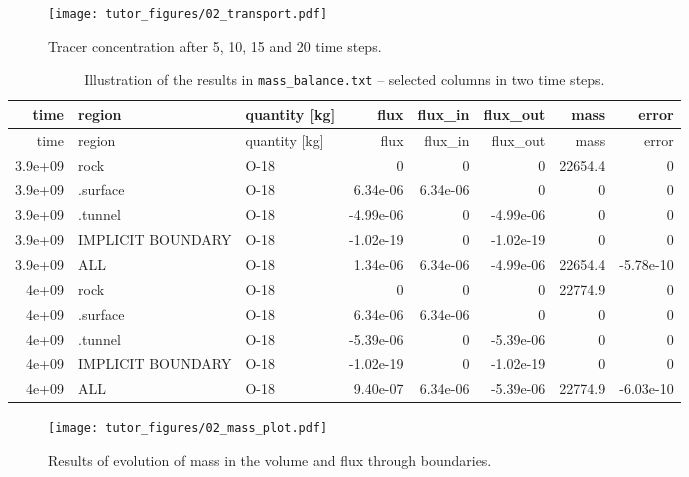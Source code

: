 \begin{figure}
\hypertarget{fig:transport}{%
\centering
\texttt{[image: tutor\_figures/02\_transport.pdf]}
\caption{Tracer concentration after 5, 10, 15 and 20 time
steps.}\label{fig:transport}
}
\end{figure}

\begin{longtable}[]{@{}rllrrrrr@{}}
\caption{Illustration of the results in \texttt{mass\_balance.txt} --
selected columns in two time steps.
\label{tbl:mass_balance}}\tabularnewline
\toprule
time & region & quantity {[}kg{]} & flux & flux\_in & flux\_out & mass &
error\tabularnewline
\midrule
\endfirsthead
\toprule
time & region & quantity {[}kg{]} & flux & flux\_in & flux\_out & mass &
error\tabularnewline
\midrule
\endhead
3.9e+09 & rock & O-18 & 0 & 0 & 0 & 22654.4 & 0\tabularnewline
3.9e+09 & .surface & O-18 & 6.34e-06 & 6.34e-06 & 0 & 0 &
0\tabularnewline
3.9e+09 & .tunnel & O-18 & -4.99e-06 & 0 & -4.99e-06 & 0 &
0\tabularnewline
3.9e+09 & IMPLICIT BOUNDARY & O-18 & -1.02e-19 & 0 & -1.02e-19 & 0 &
0\tabularnewline
3.9e+09 & ALL & O-18 & 1.34e-06 & 6.34e-06 & -4.99e-06 & 22654.4 &
-5.78e-10\tabularnewline
4e+09 & rock & O-18 & 0 & 0 & 0 & 22774.9 & 0\tabularnewline
4e+09 & .surface & O-18 & 6.34e-06 & 6.34e-06 & 0 & 0 & 0\tabularnewline
4e+09 & .tunnel & O-18 & -5.39e-06 & 0 & -5.39e-06 & 0 &
0\tabularnewline
4e+09 & IMPLICIT BOUNDARY & O-18 & -1.02e-19 & 0 & -1.02e-19 & 0 &
0\tabularnewline
4e+09 & ALL & O-18 & 9.40e-07 & 6.34e-06 & -5.39e-06 & 22774.9 &
-6.03e-10\tabularnewline
\bottomrule
\end{longtable}

\begin{figure}
\hypertarget{fig:mass_plot}{%
\centering
\texttt{[image: tutor\_figures/02\_mass\_plot.pdf]}
\caption{Results of evolution of mass in the volume and flux through
boundaries.}\label{fig:mass_plot}
}
\end{figure}
